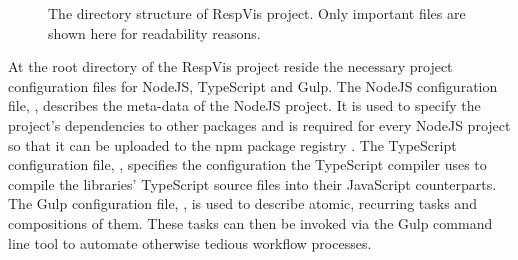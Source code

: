 \begin{figure}[tp]
\centering
{}
\caption[RespVis Directory Structure]{
  The directory structure of RespVis project. 
  Only important files are shown here for readability reasons.
}
\label{fig:RespVisDirTree}
\end{figure}

At the root directory of the RespVis project reside the necessary project configuration files for NodeJS, TypeScript and Gulp.
The NodeJS configuration file, , describes the meta-data of the NodeJS project.
It is used to specify the project's dependencies to other packages and is required for every NodeJS project so that it can be uploaded to the npm package registry \parencite{npm}.
The TypeScript configuration file, , specifies the configuration the TypeScript compiler uses to compile the libraries' TypeScript source files into their JavaScript counterparts.
The Gulp configuration file, , is used to describe atomic, recurring tasks and compositions of them.
These tasks can then be invoked via the Gulp command line tool to automate otherwise tedious workflow processes.


